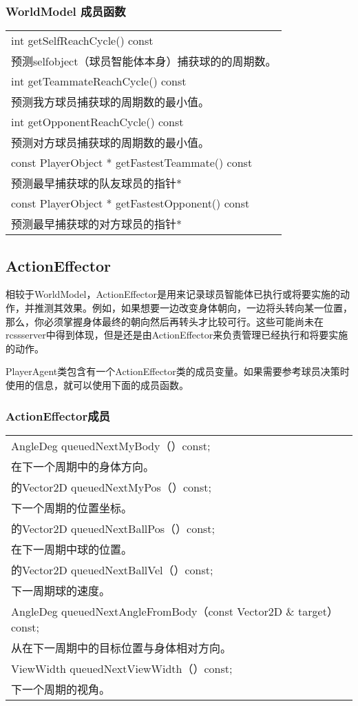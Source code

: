 \subsubsection{WorldModel 成员函数}
\begin{tabular}{p{}}
	\hline	
int getSelfReachCycle() const\\
预测selfobject（球员智能体本身）捕获球的的周期数。\\ 
	\hline	
int getTeammateReachCycle() const\\
预测我方球员捕获球的周期数的最小值。 \\
	\hline	
int getOpponentReachCycle() const\\
预测对方球员捕获球的周期数的最小值。 \\
	\hline	
const PlayerObject * getFastestTeammate() const\\
预测最早捕获球的队友球员的指针*\\
	\hline	
const PlayerObject * getFastestOpponent() const\\
预测最早捕获球的对方球员的指针*\\
	\hline	
\end{tabular}



\subsection{ActionEffector}
相较于WorldModel，ActionEffector是用来记录球员智能体已执行或将要实施的动作，并推测其效果。例如，如果想要一边改变身体朝向，一边将头转向某一位置，那么，你必须掌握身体最终的朝向然后再转头才比较可行。这些可能尚未在rcssserver中得到体现，但是还是由ActionEffector来负责管理已经执行和将要实施的动作。

PlayerAgent类包含有一个ActionEffector类的成员变量。如果需要参考球员决策时使用的信息，就可以使用下面的成员函数。

\subsubsection{ActionEffector成员 }
\begin{tabular}{p{}}
	\hline	
AngleDeg queuedNextMyBody（）const; \\
在下一个周期中的身体方向。 \\
	\hline	
的Vector2D queuedNextMyPos（）const; \\
下一个周期的位置坐标。 \\
	\hline	
的Vector2D queuedNextBallPos（）const;\\ 
在下一周期中球的位置。 \\
	\hline	
的Vector2D queuedNextBallVel（）const;\\ 
下一周期球的速度。 \\
	\hline	
AngleDeg queuedNextAngleFromBody（const Vector2D \& target） const; \\
从在下一周期中的目标位置与身体相对方向。 \\
	\hline	
ViewWidth queuedNextViewWidth（）const; \\
下一个周期的视角。\\
	\hline	
\end{tabular}


